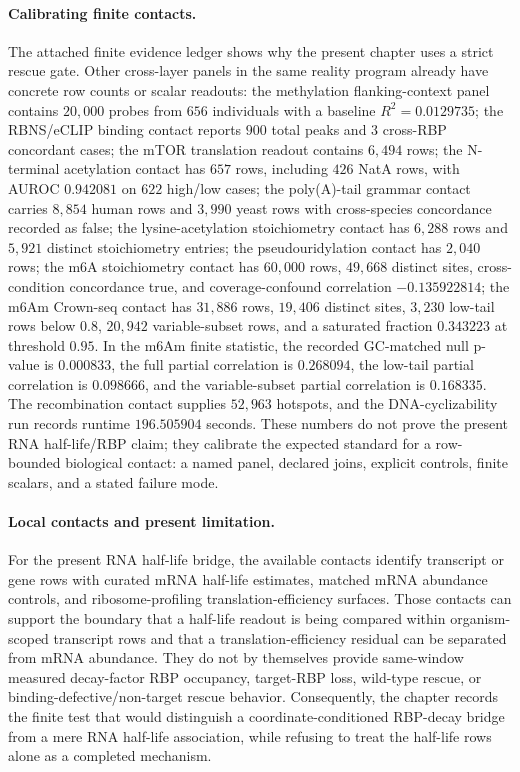 \paragraph{Calibrating finite contacts.}
The attached finite evidence ledger shows why the present chapter uses a strict rescue gate.  Other cross-layer panels in the same reality program already have concrete row counts or scalar readouts: the methylation flanking-context panel contains $20{,}000$ probes from $656$ individuals with a baseline $R^2=0.0129735$; the RBNS/eCLIP binding contact reports $900$ total peaks and $3$ cross-RBP concordant cases; the mTOR translation readout contains $6{,}494$ rows; the N-terminal acetylation contact has $657$ rows, including $426$ NatA rows, with AUROC $0.942081$ on $622$ high/low cases; the poly(A)-tail grammar contact carries $8{,}854$ human rows and $3{,}990$ yeast rows with cross-species concordance recorded as false; the lysine-acetylation stoichiometry contact has $6{,}288$ rows and $5{,}921$ distinct stoichiometry entries; the pseudouridylation contact has $2{,}040$ rows; the m6A stoichiometry contact has $60{,}000$ rows, $49{,}668$ distinct sites, cross-condition concordance true, and coverage-confound correlation $-0.135922814$; the m6Am Crown-seq contact has $31{,}886$ rows, $19{,}406$ distinct sites, $3{,}230$ low-tail rows below $0.8$, $20{,}942$ variable-subset rows, and a saturated fraction $0.343223$ at threshold $0.95$.  In the m6Am finite statistic, the recorded GC-matched null p-value is $0.000833$, the full partial correlation is $0.268094$, the low-tail partial correlation is $0.098666$, and the variable-subset partial correlation is $0.168335$.  The recombination contact supplies $52{,}963$ hotspots, and the DNA-cyclizability run records runtime $196.505904$ seconds.  These numbers do not prove the present RNA half-life/RBP claim; they calibrate the expected standard for a row-bounded biological contact: a named panel, declared joins, explicit controls, finite scalars, and a stated failure mode.

\paragraph{Local contacts and present limitation.}
For the present RNA half-life bridge, the available contacts identify transcript or gene rows with curated mRNA half-life estimates, matched mRNA abundance controls, and ribosome-profiling translation-efficiency surfaces.  Those contacts can support the boundary that a half-life readout is being compared within organism-scoped transcript rows and that a translation-efficiency residual can be separated from mRNA abundance.  They do not by themselves provide same-window measured decay-factor RBP occupancy, target-RBP loss, wild-type rescue, or binding-defective/non-target rescue behavior.  Consequently, the chapter records the finite test that would distinguish a coordinate-conditioned RBP-decay bridge from a mere RNA half-life association, while refusing to treat the half-life rows alone as a completed mechanism.

